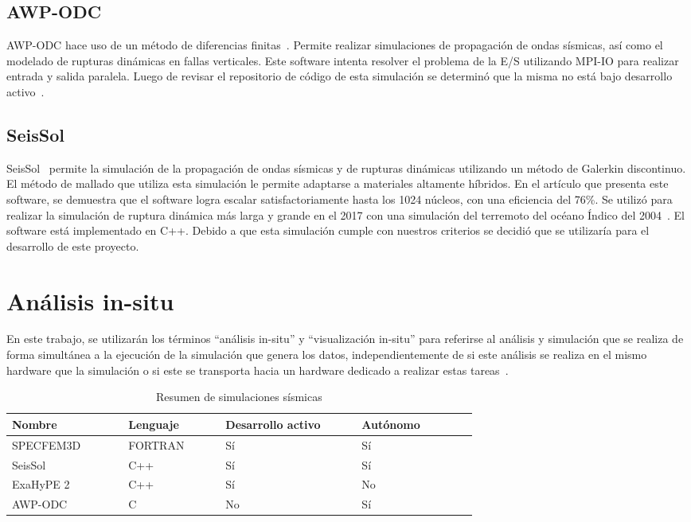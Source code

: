 \subsection{AWP-ODC}
AWP-ODC hace uso de un método de diferencias finitas~\cite{Cui2010}. Permite realizar simulaciones de propagación de ondas sísmicas, así como el modelado de rupturas dinámicas en fallas verticales. Este software intenta resolver el problema de la E/S utilizando MPI-IO para realizar entrada y salida paralela. Luego de revisar el repositorio de código de esta simulación se determinó que la misma no está bajo desarrollo activo~\cite{githubGitHubHPGeoCawpodcos}.

\subsection{SeisSol}
SeisSol~\cite{Kser2010} permite la simulación de la propagación de ondas sísmicas y de rupturas dinámicas utilizando un método de Galerkin discontinuo. El método de mallado que utiliza esta simulación le permite adaptarse a materiales altamente híbridos. En el artículo que presenta este software, se demuestra que el software logra escalar satisfactoriamente hasta los 1024 núcleos, con una eficiencia del 76\%. Se utilizó para realizar la simulación de ruptura dinámica más larga y grande en el 2017 con una simulación del terremoto del océano Índico del 2004~\cite{Uphoff2017}. El software está implementado en C++. Debido a que esta simulación cumple con nuestros criterios se decidió que se utilizaría para el desarrollo de este proyecto.

\section{Análisis in-situ}
En este trabajo, se utilizarán los términos ``análisis in-situ'' y ``visualización in-situ'' para referirse al análisis y simulación que se realiza de forma simultánea a la ejecución de la simulación que genera los datos, independientemente de si este análisis se realiza en el mismo hardware que la simulación o si este se transporta hacia un hardware dedicado a realizar estas tareas~\cite{childs_terminology_2020}.

\begin{table}
    \centering
    \begin{tabular}{|p{0.17\linewidth}|p{0.14\linewidth}|p{0.20\linewidth}|p{0.17\linewidth}|}
    \hline
         Nombre & Lenguaje & Desarrollo activo & Autónomo \\
         \hline
         SPECFEM3D & FORTRAN & Sí & Sí \\ 
         \hline
         SeisSol & C++ & Sí & Sí \\
         \hline
         ExaHyPE 2 & C++ & Sí & No \\
         \hline
         AWP-ODC & C & No & Sí \\
         \hline
         
    \end{tabular}
    \caption{Resumen de simulaciones sísmicas}
    \label{tab:seismic_simulations}
\end{table}

